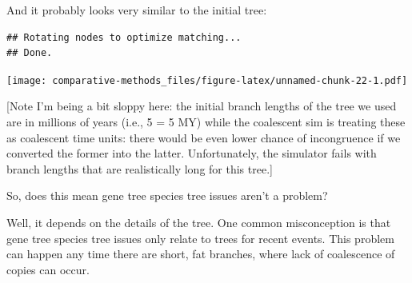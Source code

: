 \documentclass[
]{article}
\newenvironment{Shaded}{\begin{snugshade}}{\end{snugshade}}
\newcommand{\DecValTok}[1]{\textcolor[rgb]{0.00,0.00,0.81}{#1}}
\newcommand{\KeywordTok}[1]{\textcolor[rgb]{0.13,0.29,0.53}{\textbf{#1}}}
\newcommand{\NormalTok}[1]{#1}
\newcommand{\OperatorTok}[1]{\textcolor[rgb]{0.81,0.36,0.00}{\textbf{#1}}}
\newcommand{\StringTok}[1]{\textcolor[rgb]{0.31,0.60,0.02}{#1}}
\begin{document}
And it probably looks very similar to the initial tree:

\begin{Shaded}
\end{Shaded}

\begin{verbatim}
## Rotating nodes to optimize matching...
## Done.
\end{verbatim}

\texttt{[image: comparative-methods\_files/figure-latex/unnamed-chunk-22-1.pdf]}

{[}Note I'm being a bit sloppy here: the initial branch lengths of the tree we used are in millions of years (i.e., 5 = 5 MY) while the coalescent sim is treating these as coalescent time units: there would be even lower chance of incongruence if we converted the former into the latter. Unfortunately, the simulator fails with branch lengths that are realistically long for this tree.{]}

So, does this mean gene tree species tree issues aren't a problem?

Well, it depends on the details of the tree. One common misconception is that gene tree species tree issues only relate to trees for recent events. This problem can happen any time there are short, fat branches, where lack of coalescence of copies can occur.

\begin{Shaded}
\end{Shaded}
\end{document}
